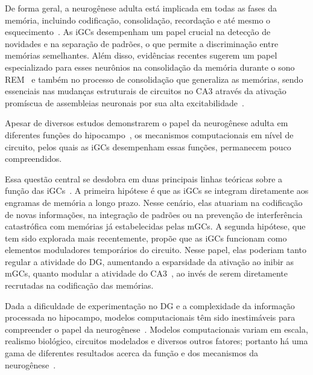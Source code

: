 De forma geral, a neurogênese adulta está implicada em todas as fases da memória, incluindo codificação, consolidação, recordação
e até mesmo o esquecimento~\cite{chavanMemory2025}. As iGCs desempenham um papel crucial na detecção de novidades e na separação
de padrões, o que permite a discriminação entre memórias semelhantes. Além disso, evidências recentes sugerem um papel
especializado para esses neurônios na consolidação da memória durante o sono REM~\cite{chavanMemory2025} e também no processo de
consolidação que generaliza as memórias, sendo essenciais nas mudanças estruturais de circuitos no CA3 através da ativação
promíscua de assembleias neuronais por sua alta excitabilidade~\cite{koSystems2025}.

Apesar de diversos estudos demonstrarem o papel da neurogênese adulta em diferentes funções do hipocampo~\cite{chavanMemory2025,
berdugo-vegaSharpening2023}, os mecanismos computacionais em nível de circuito, pelos quais as iGCs desempenham essas funções,
permanecem pouco compreendidos.

Essa questão central se desdobra em duas principais linhas teóricas sobre a função das iGCs~\cite{berdugo-vegaSharpening2023}. A
primeira hipótese é que as iGCs se integram diretamente aos engramas de memória a longo prazo. Nesse cenário, elas atuariam na
codificação de novas informações, na integração de padrões ou na prevenção de interferência catastrófica com memórias já
estabelecidas pelas mGCs. A segunda hipótese, que tem sido explorada mais recentemente, propõe que as iGCs funcionam como
elementos moduladores temporários do circuito. Nesse papel, elas poderiam tanto regular a atividade do DG, aumentando a
esparsidade da ativação ao inibir as mGCs, quanto modular a atividade do CA3~\cite{aimoneComputational2016,
berdugo-vegaSharpening2023}, ao invés de serem diretamente recrutadas na codificação das memórias.

Dada a dificuldade de experimentação no DG e a complexidade da informação processada no hipocampo, modelos computacionais têm sido
inestimáveis para compreender o papel da neurogênese~\cite{aimoneComputational2016}. Modelos computacionais variam em escala,
realismo biológico, circuitos modelados e diversos outros fatores; portanto há uma gama de diferentes resultados acerca da função
e dos mecanismos da neurogênese~\cite{aimoneComputational2016, berdugo-vegaSharpening2023}.

